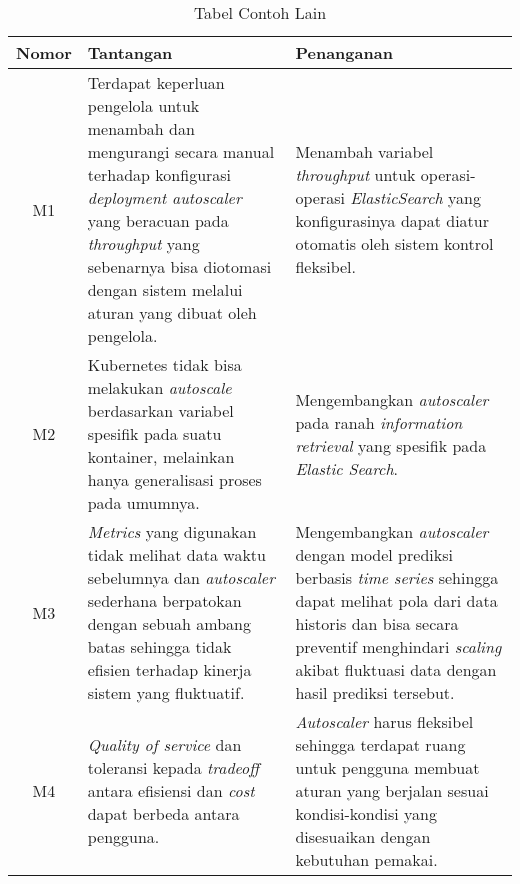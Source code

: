 \begin{table}[h]
    \caption{Tabel Contoh Lain}
    \vspace{0.25cm}
    \begin{center}
        \begin{tabular}{|c|p{2.5in}|p{2.5in}|}
            \rowcolor{gray!30}
            \hline
            \textbf{Nomor} & \textbf{Tantangan} & \textbf{Penanganan} \tabularnewline
            \hline
            M1 & Terdapat keperluan pengelola untuk menambah dan mengurangi secara manual terhadap konfigurasi \textit{deployment autoscaler} yang beracuan pada \textit{throughput} yang sebenarnya bisa diotomasi dengan sistem melalui aturan yang dibuat oleh pengelola. &
            Menambah variabel \textit{throughput} untuk operasi-operasi \textit{ElasticSearch} yang konfigurasinya dapat diatur otomatis oleh sistem kontrol fleksibel.
            \tabularnewline

            M2 &
            Kubernetes tidak bisa melakukan \textit{autoscale} berdasarkan variabel spesifik pada suatu kontainer, melainkan hanya generalisasi proses pada umumnya. &
            Mengembangkan \textit{autoscaler} pada ranah \textit{information retrieval} yang spesifik pada \textit{Elastic Search}. \tabularnewline

            M3 &
            \textit{Metrics} yang digunakan tidak melihat data waktu sebelumnya dan \textit{autoscaler} sederhana berpatokan dengan sebuah ambang batas sehingga tidak efisien terhadap kinerja sistem yang fluktuatif. &
            Mengembangkan \textit{autoscaler} dengan model prediksi berbasis \textit{time series} sehingga dapat melihat pola dari data historis dan bisa secara preventif menghindari \textit{scaling} akibat fluktuasi data dengan hasil prediksi tersebut.\tabularnewline

            M4 & \textit{Quality of service} dan toleransi kepada \textit{tradeoff} antara efisiensi dan \textit{cost} dapat berbeda antara pengguna. &
            \textit{Autoscaler} harus fleksibel sehingga terdapat ruang untuk pengguna membuat aturan yang berjalan sesuai kondisi-kondisi yang disesuaikan dengan kebutuhan pemakai.\tabularnewline

            \hline
        \end{tabular}
    \end{center}
    \label{tab:contoh-lain}
\end{table}
